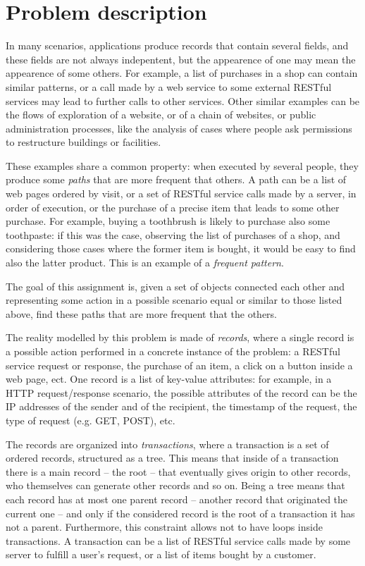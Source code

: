\documentclass{acm_proc_article-sp-sigmod09}
\begin{document}
\section{Problem description}
In many scenarios, applications produce records that contain several fields, and these fields are not always indepentent, but the appearence of one may mean the appearence of some others. For example, a list of purchases in a shop can contain similar patterns, or a call made by a web service to some external RESTful services may lead to further calls to other services. Other similar examples can be the flows of exploration of a website, or of a chain of websites, or public administration processes, like the analysis of cases where people ask permissions to restructure buildings or facilities. 

These examples share a common property: when executed by several people, they produce some \emph{paths} that are more frequent that others. A path can be a list of web pages ordered by visit, or a set of RESTful service calls made by a server, in order of execution, or the purchase of a precise item that leads to some other purchase. For example, buying a toothbrush is likely to purchase also some toothpaste: if this was the case, observing the list of purchases of a shop, and considering those cases where the former item is bought, it would be easy to find also the latter product. This is an example of a \emph{frequent pattern}.

The goal of this assignment is, given a set of objects connected each other and representing some action in a possible scenario equal or similar to those listed above, find these paths that are more frequent that the others. 

The reality modelled by this problem is made of \emph{records}, where a single record is a possible action performed in a concrete instance of the problem: a RESTful service request or response, the purchase of an item, a click on a button inside a web page, ect. One record is a list of key-value attributes: for example, in a HTTP request/response scenario, the possible attributes of the record can be the IP addresses of the sender and of the recipient, the timestamp of the request, the type of request (e.g. GET, POST), etc. 

The records are organized into \emph{transactions}, where a transaction is a set of ordered records, structured as a tree. This means that inside of a transaction there is a main record -- the root -- that eventually gives origin to other records, who themselves can generate other records and so on. Being a tree means that each record has at most one parent record -- another record that originated the current one -- and only if the considered record is the root of a transaction it has not a parent. Furthermore, this constraint allows not to have loops inside transactions. A transaction can be a list of RESTful service calls made by some server to fulfill a user's request, or a list of items bought by a customer.
\end{document}
